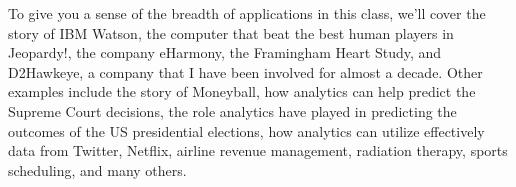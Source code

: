 To give you a sense of the breadth of applications
in this class, we'll cover the story
of IBM Watson, the computer that beat the best human players
in Jeopardy!, the company eHarmony, the Framingham Heart
Study, and D2Hawkeye, a company that I have
been involved for almost a decade.
Other examples include the story of Moneyball,
how analytics can help predict the Supreme Court decisions,
the role analytics have played in predicting
the outcomes of the US presidential elections, how
analytics can utilize effectively data from Twitter,
Netflix, airline revenue management, radiation
therapy, sports scheduling, and many others.